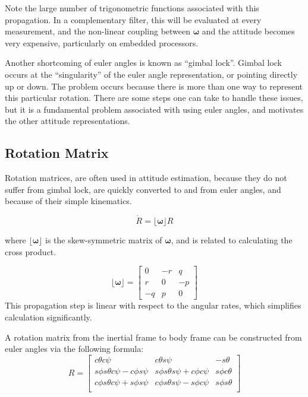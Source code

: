 \documentclass[paper=a4, fontsize=11pt]{scrartcl} %
\numberwithin{equation}{section} %
\numberwithin{figure}{section} %
\numberwithin{table}{section} %
\begin{document}
Note the large number of trigonometric functions associated with this propagation.  In a complementary filter, this will be evaluated at every measurement, and the non-linear coupling between $\bm{\omega}$  and the attitude becomes very expensive, particularly on embedded processors.

Another shortcoming of euler angles is known as ``gimbal lock''.  Gimbal lock occurs at the ``singularity'' of the euler angle representation, or pointing directly up or down.  The problem occurs because there is more than one way to represent this particular rotation.  There are some steps one can take to handle these issues, but it is a fundamental problem associated with using euler angles, and motivates the other attitude representations.

\subsection{Rotation Matrix}

Rotation matrices, are often used in attitude estimation, because they do not suffer from gimbal lock, are quickly converted to and from euler angles, and because of their simple kinematics.

\begin{equation}
	\dot{R} = \lfloor\bm{\omega}\rfloor R
\end{equation}

where $\lfloor \bm{\omega} \rfloor$ is the skew-symmetric matrix of $\bm{\omega}$, and is related to calculating the cross product.

\begin{equation}
	\lfloor\bm{\omega}\rfloor =
	\begin{bmatrix}
		0 & -r & q \\
		r & 0 & -p \\
		-q & p & 0
	\end{bmatrix}
\end{equation}
  This propagation step is linear with respect to the angular rates, which simplifies calculation significantly.

A rotation matrix from the inertial frame to body frame can be constructed from euler angles via the following formula:
\newcommand{\ct}{c\theta}
\newcommand{\cp}{c\phi}
\newcommand{\cs}{c\psi}
\newcommand{\st}{s\theta}
\newcommand{\sphi}{s\phi}
\newcommand{\spsi}{s\psi}
\begin{equation}
	    R = \begin{bmatrix}
	    	\ct\cs & \ct\spsi & -\st \\
        \sphi\st\cs-\cp\spsi & \sphi\st\spsi+\cp\cs & \sphi\ct \\
        \cp\st\cs+\sphi\spsi & \cp\st\spsi-\sphi\cs & \sphi\st \\
        \end{bmatrix}
\end{equation}
\end{document}
